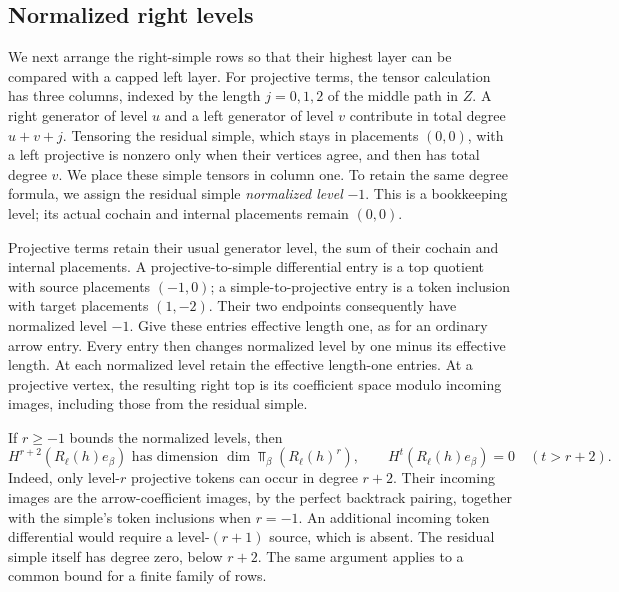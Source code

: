 \subsection{Normalized right levels}

We next arrange the right-simple rows so that their highest layer can
be compared with a capped left layer. For projective terms, the tensor
calculation has three columns, indexed by the length $j=0,1,2$ of the
middle path in $Z$. A right generator of level $u$ and a left generator
of level $v$ contribute in total degree $u+v+j$.
Tensoring the residual simple, which stays in placements $(0,0)$,
with a left projective is nonzero only when their vertices agree,
and then has total degree $v$. We place these simple tensors in column one.
To retain the same degree formula, we assign the residual simple
\emph{normalized level} $-1$. This is a bookkeeping level; its actual
cochain and internal placements remain $(0,0)$.

Projective terms retain their usual generator level, the sum of their
cochain and internal placements.
A projective-to-simple differential entry is a top quotient with source
placements $(-1,0)$; a simple-to-projective entry is a token inclusion
with target placements $(1,-2)$. Their two endpoints consequently have
normalized level $-1$. Give these entries effective length one, as for
an ordinary arrow entry. Every entry then changes normalized level by
one minus its effective length. At each normalized level retain the
effective length-one entries. At a projective vertex, the resulting
right top is its coefficient space modulo incoming images, including
those from the residual simple.

If $r\geq-1$ bounds the normalized levels, then
\begin{equation}
 H^{r+2}(R_\ell(h)e_\beta)
 \text{ has dimension }\dim\Top_\beta(R_\ell(h)^r),
 \qquad
 H^t(R_\ell(h)e_\beta)=0\quad(t>r+2).
 \label{two:right-top}
\end{equation}
Indeed, only level-$r$ projective tokens can occur in degree $r+2$.
Their incoming images are the arrow-coefficient images, by the perfect
backtrack pairing, together with the simple's token inclusions when
$r=-1$. An additional incoming token differential would require a
level-$(r+1)$ source, which is absent. The residual simple itself has
degree zero, below $r+2$. The same argument applies to a common bound
for a finite family of rows.

